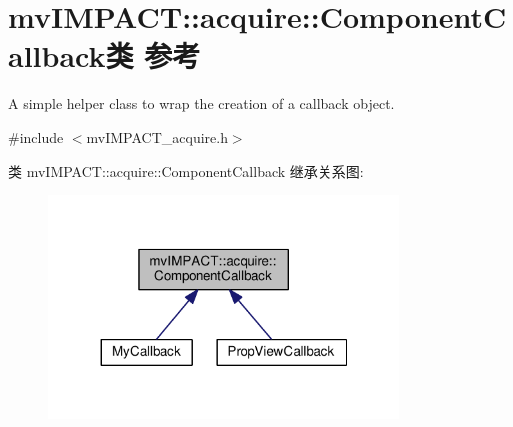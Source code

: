 \hypertarget{classmv_i_m_p_a_c_t_1_1acquire_1_1_component_callback}{\section{mv\+I\+M\+P\+A\+C\+T\+:\+:acquire\+:\+:Component\+Callback类 参考}
\label{classmv_i_m_p_a_c_t_1_1acquire_1_1_component_callback}
}


A simple helper class to wrap the creation of a callback object.  




{\ttfamily \#include $<$mv\+I\+M\+P\+A\+C\+T\+\_\+acquire.\+h$>$}



类 mv\+I\+M\+P\+A\+C\+T\+:\+:acquire\+:\+:Component\+Callback 继承关系图\+:
\nopagebreak
\begin{figure}[H]
\begin{center}
\leavevmode
\includegraphics[width=263pt]{classmv_i_m_p_a_c_t_1_1acquire_1_1_component_callback__inherit__graph}
\end{center}
\end{figure}
